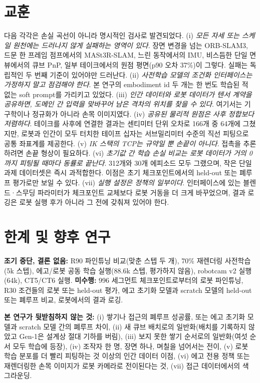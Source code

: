 \documentclass[conference,10pt]{IEEEtran}
\begin{document}
\section{교훈}\label{sec:lessons}
다음 각각은 손실 곡선이 아니라 명시적인 검사로 발견되었다. (i) \emph{모든 자세 또는 스케일 원천에는 드러나지 않게 실패하는 영역이
있다}. 장면 변경을 넘는 ORB-SLAM3, 드문 한 프레임 점프에서의 MASt3R-SLAM, 느린 동작에서의 IMU, 비스듬한 단일 면 뷰에서의 큐브 PnP,
일부 테이크에서의 원점 평면(p90 오차 37\%)이 그렇다. 실패는 독립적인 두 번째 기준이 있어야만 드러난다. (ii) \emph{사전학습 모델의
조건화 인터페이스는 가정하지 말고 점검해야 한다}. 본 연구의 embodiment id 두 개는 한 번도 학습된 적 없는 soft prompt를 가리키고
있었다. (iii) \emph{인간 데이터와 로봇 데이터가 텐서 계약을 공유하면, 도메인 간 입력을 맞바꾸어 남은 격차의 위치를 찾을 수 있다}.
여기서는 기구학이나 정규화가 아니라 손목 이미지였다. (iv) \emph{공유된 물리적 원점은 사후 정합보다 저렴하다}. 테이크를 사후에
연결한 결과는 센티미터 단위 오차로 166개 중 64개에 그쳤지만, 로봇과 인간이 모두 터치한 테이프 십자는 서브밀리미터 수준의 직선
피팅으로 공통 좌표계를 제공한다. (v) \emph{IK 스택의 TCP는 규약일 뿐 손끝이 아니다}. 접촉을 추론하려면 손끝 형상이 필요하다.
(vi) \emph{초기값 간 학습 손실 비교는 로봇 데이터가 거의 0까지 피팅될 때마다 동률로 끝난다}. 312개와 30개 에피소드 모두 그랬으며,
작은 단일 과제 데이터셋은 즉시 과적합한다. 이점은 초기 체크포인트에서의 held-out 또는 폐루프 평가로만 보일 수 있다. (vii) \emph{실행
설정은 정책의 일부이다}. 인터페이스에 있는 블렌드·스무딩 파라미터가 체크포인트 교체보다 로봇 거동을 더 크게 바꾸었으며, 결과
로깅은 로봇 실행 후가 아니라 그 전에 갖춰져 있어야 한다.

\section{한계 및 향후 연구}\label{sec:lim}
\textbf{조기 중단, 결론 없음:} R90 파인튜닝 비교(맞춘 스텝 두 개), 70\% 재렌더링 사전학습(5k 스텝), 에고/로봇 공동 학습 실행(88.6k
스텝, 평가하지 않음), robotcam v2 실행(64k), CT5/CT6 실행. \textbf{미수행:} 996 세그먼트 체크포인트로부터의 로봇 파인튜닝, R30
조건들의 로봇 또는 held-out 평가, 에고 초기화 모델과 scratch 모델의 held-out 또는 폐루프 비교, 로봇에서의 결과 로깅.

\textbf{본 연구가 뒷받침하지 않는 것:} (i) 쌓기나 접근의 폐루프 성공률, 또는 에고 초기화 모델과 scratch 모델 간의 폐루프 차이,
(ii) 새 큐브 배치로의 일반화(배치를 기록하지 않았고 Gen-1은 설계상 절대 기하를 버림), (iii) 보지 못한 쌓기 순서로의 일반화(여섯 순서
모두 학습에 등장), (iv) 조작자 한 명, 장면 하나, 며칠을 넘어서는 전이, (v) 로봇 학습 분포를 더 빨리 피팅하는 것 이상의 인간 데이터
이점, (vi) 에고 전용 정책 또는 재렌더링한 손목 이미지가 로봇 카메라로 전이된다는 것, (vii) 접근 데이터에서의 색 그라운딩.
\end{document}
